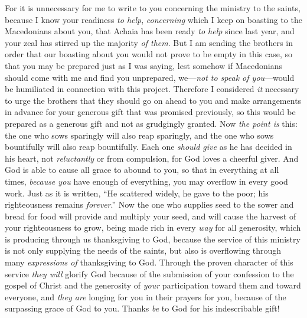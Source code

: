 \begin{biblechapter} %
 For it is unnecessary for me to write to you concerning the ministry to the saints,
\verse because I know your readiness \textit{to help}, \textit{concerning} which I keep on boasting to the Macedonians about you, that Achaia has been ready \textit{to help} since last year, and your zeal has stirred up the majority \textit{of them}.
\verse But I am sending the brothers in order that our boasting about you would not prove to be empty in this case, so that you may be prepared just as I was saying,
\verse lest somehow if Macedonians should come with me and find you unprepared, we—\textit{not to speak of you}—would be humiliated in connection with this project.
\verse Therefore I considered \textit{it} necessary to urge the brothers that they should go on ahead to you and make arrangements in advance for your generous gift that was promised previously, so this would be prepared as a generous gift and not as grudgingly granted.
\verse Now \textit{the point is} this: the one who sows sparingly will also reap sparingly, and the one who sows bountifully will also reap bountifully.
\verse Each one \textit{should give} as he has decided in his heart, not \textit{reluctantly} or from compulsion, for God loves a cheerful giver.
\verse And God is able to cause all grace to abound to you, so that in everything at all times, \textit{because you} have enough of everything, you may overflow in every good work.
\verse Just as it is written, “He scattered widely, he gave to the poor; 
his righteousness remains \textit{forever}.”
\verse Now the one who supplies seed to the sower and bread for food will provide and multiply your seed, and will cause the harvest of your righteousness to grow,
\verse being made rich in every \textit{way} for all generosity, which is producing through us thanksgiving to God,
\verse because the service of this ministry is not only supplying the needs of the saints, but also is overflowing through many \textit{expressions of} thanksgiving to God.
\verse Through the proven character of this service \textit{they will} glorify God because of the submission of your confession to the gospel of Christ and the generosity of \textit{your} participation toward them and toward everyone,
\verse and \textit{they are} longing for you in their prayers for you, because of the surpassing grace of God to you.
\verse Thanks \textit{be} to God for his indescribable gift!
\end{biblechapter}

